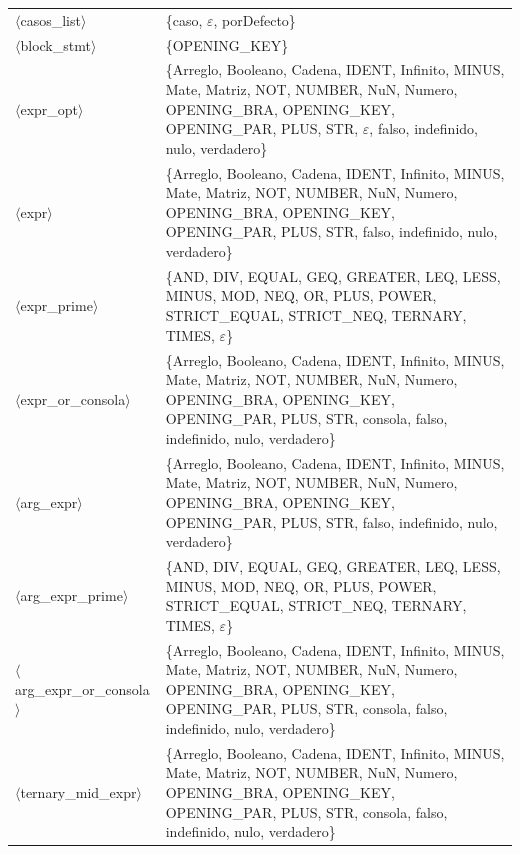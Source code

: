 \documentclass[10pt]{article}
\begin{document}
{\begin{longtable}{@{} p{3.5cm} p{13cm} @{}}
  \parbox[t]{3.3cm}{\raggedright$\langle$casos\_\allowbreak{}list$\rangle$} & \{caso, $\varepsilon$, porDefecto\} \\
  \parbox[t]{3.3cm}{\raggedright$\langle$block\_\allowbreak{}stmt$\rangle$} & \{OPENING\_KEY\} \\
  \parbox[t]{3.3cm}{\raggedright$\langle$expr\_\allowbreak{}opt$\rangle$} & \{Arreglo, Booleano, Cadena, IDENT, Infinito, MINUS, Mate, Matriz, NOT, NUMBER, NuN, Numero, OPENING\_BRA, OPENING\_KEY, OPENING\_PAR, PLUS, STR, $\varepsilon$, falso, indefinido, nulo, verdadero\} \\
  \parbox[t]{3.3cm}{\raggedright$\langle$expr$\rangle$} & \{Arreglo, Booleano, Cadena, IDENT, Infinito, MINUS, Mate, Matriz, NOT, NUMBER, NuN, Numero, OPENING\_BRA, OPENING\_KEY, OPENING\_PAR, PLUS, STR, falso, indefinido, nulo, verdadero\} \\
  \parbox[t]{3.3cm}{\raggedright$\langle$expr\_\allowbreak{}prime$\rangle$} & \{AND, DIV, EQUAL, GEQ, GREATER, LEQ, LESS, MINUS, MOD, NEQ, OR, PLUS, POWER, STRICT\_EQUAL, STRICT\_NEQ, TERNARY, TIMES, $\varepsilon$\} \\
  \parbox[t]{3.3cm}{\raggedright$\langle$expr\_\allowbreak{}or\_\allowbreak{}consola$\rangle$} & \{Arreglo, Booleano, Cadena, IDENT, Infinito, MINUS, Mate, Matriz, NOT, NUMBER, NuN, Numero, OPENING\_BRA, OPENING\_KEY, OPENING\_PAR, PLUS, STR, consola, falso, indefinido, nulo, verdadero\} \\
  \parbox[t]{3.3cm}{\raggedright$\langle$arg\_\allowbreak{}expr$\rangle$} & \{Arreglo, Booleano, Cadena, IDENT, Infinito, MINUS, Mate, Matriz, NOT, NUMBER, NuN, Numero, OPENING\_BRA, OPENING\_KEY, OPENING\_PAR, PLUS, STR, falso, indefinido, nulo, verdadero\} \\
  \parbox[t]{3.3cm}{\raggedright$\langle$arg\_\allowbreak{}expr\_\allowbreak{}prime$\rangle$} & \{AND, DIV, EQUAL, GEQ, GREATER, LEQ, LESS, MINUS, MOD, NEQ, OR, PLUS, POWER, STRICT\_EQUAL, STRICT\_NEQ, TERNARY, TIMES, $\varepsilon$\} \\
  \parbox[t]{3.3cm}{\raggedright$\langle$arg\_\allowbreak{}expr\_\allowbreak{}or\_\allowbreak{}consola$\rangle$} & \{Arreglo, Booleano, Cadena, IDENT, Infinito, MINUS, Mate, Matriz, NOT, NUMBER, NuN, Numero, OPENING\_BRA, OPENING\_KEY, OPENING\_PAR, PLUS, STR, consola, falso, indefinido, nulo, verdadero\} \\
  \parbox[t]{3.3cm}{\raggedright$\langle$ternary\_\allowbreak{}mid\_\allowbreak{}expr$\rangle$} & \{Arreglo, Booleano, Cadena, IDENT, Infinito, MINUS, Mate, Matriz, NOT, NUMBER, NuN, Numero, OPENING\_BRA, OPENING\_KEY, OPENING\_PAR, PLUS, STR, consola, falso, indefinido, nulo, verdadero\} \\

\end{longtable}}
\end{document}
